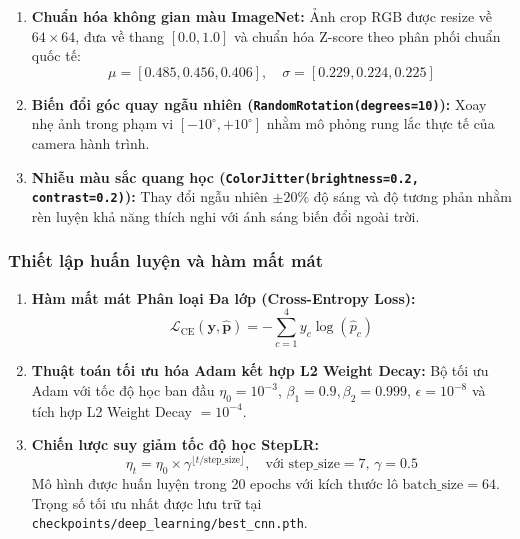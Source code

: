 \documentclass[a4paper, 11pt]{article}
\begin{document}
\begin{enumerate}
    \item \textbf{Chuẩn hóa không gian màu ImageNet:} Ảnh crop RGB được resize về $64 \times 64$, đưa về thang $[0.0, 1.0]$ và chuẩn hóa Z-score theo phân phối chuẩn quốc tế:
    \begin{equation}
        \mu = [0.485, 0.456, 0.406], \quad \sigma = [0.229, 0.224, 0.225]
        \label{eq:imagenet_norm}
    \end{equation}
    \item \textbf{Biến đổi góc quay ngẫu nhiên (\texttt{RandomRotation(degrees=10)}):} Xoay nhẹ ảnh trong phạm vi $[-10^\circ, +10^\circ]$ nhằm mô phỏng rung lắc thực tế của camera hành trình.
    \item \textbf{Nhiễu màu sắc quang học (\texttt{ColorJitter(brightness=0.2, contrast=0.2)}):} Thay đổi ngẫu nhiên $\pm 20\%$ độ sáng và độ tương phản nhằm rèn luyện khả năng thích nghi với ánh sáng biến đổi ngoài trời.
\end{enumerate}

\subsubsection{Thiết lập huấn luyện và hàm mất mát}
\label{subsubsec:lenet_training}

\begin{enumerate}
    \item \textbf{Hàm mất mát Phân loại Đa lớp (Cross-Entropy Loss):}
    \begin{equation}
        \mathcal{L}_{\text{CE}}(\mathbf{y}, \hat{\mathbf{p}}) = -\sum_{c=1}^4 y_c \log(\hat{p}_c)
        \label{eq:ce_loss}
    \end{equation}
    \item \textbf{Thuật toán tối ưu hóa Adam kết hợp L2 Weight Decay:} Bộ tối ưu Adam với tốc độ học ban đầu $\eta_0 = 10^{-3}$, $\beta_1 = 0.9, \beta_2 = 0.999$, $\epsilon = 10^{-8}$ và tích hợp L2 Weight Decay $= 10^{-4}$.
    \item \textbf{Chiến lược suy giảm tốc độ học StepLR:}
    \begin{equation}
        \eta_t = \eta_0 \times \gamma^{\lfloor t / \text{step\_size} \rfloor}, \quad \text{với } \text{step\_size} = 7, \, \gamma = 0.5
        \label{eq:steplr}
    \end{equation}
    Mô hình được huấn luyện trong 20 epochs với kích thước lô $\text{batch\_size} = 64$. Trọng số tối ưu nhất được lưu trữ tại \texttt{checkpoints/deep\_learning/best\_cnn.pth}.
\end{enumerate}
\end{document}
